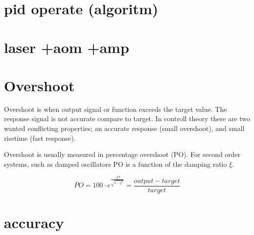 \documentclass[\main/master.tex]{subfiles}
\begin{document}
\section{pid operate (algoritm)}
\section{laser +aom +amp}
\doublespacing



\section{Overshoot}
Overshoot is when output signal or function exceeds the target value. The response signal is not accurate compare to target. In controll theory there are two wanted conflicting properties; an accurate response (small overshoot), and small risetime (fast response). 
\par\noindent
Overshoot is usually measured in percentage overshoot (PO). For second order systems, such as damped oscillators PO is a function of the damping ratio $\xi$. 


\begin{equation}
PO = 100\cdot e ^{\frac{-\xi\pi}{\sqrt{1-\xi^2}}} = \frac{output-target}{target}   \label{eqn:percentage_overshoot}
\end{equation}
 
\section{accuracy}
\end{document}
